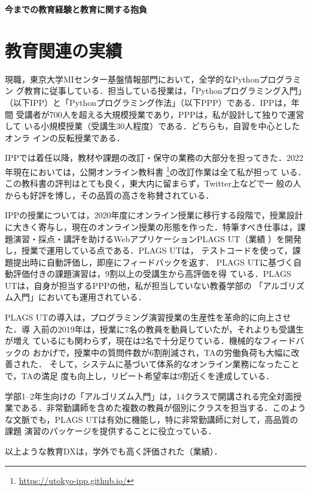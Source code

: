 \documentclass[dvipdfmx]{jsarticle}
\begin{document}
\newpage
\begin{center}
\LARGE\bfseries 今までの教育経験と教育に関する抱負
\end{center}
\bigskip

\section*{教育関連の実績}

現職，東京大学MIセンター基盤情報部門において，全学的なPythonプログラミン
グ教育に従事している．担当している授業は，「Pythonプログラミング入門」
（以下IPP）と「Pythonプログラミング作法」（以下PPP）である．IPPは，年間
受講者が700人を超える大規模授業であり，PPPは，私が設計して独りで運営して
いる小規模授業（受講生30人程度）である．どちらも，自習を中心としたオンラ
インの反転授業である．

IPPでは着任以降，教材や課題の改訂・保守の業務の大部分を担ってきた．2022
年現在においては，公開オンライン教科書
\footnote{\url{https://utokyo-ipp.github.io/}}の改訂作業は全て私が担って
いる．この教科書の評判はとても良く，東大内に留まらず，Twitter上などで一
般の人からも好評を博し，その品質の高さを称賛されている．

IPPの授業については，2020年度にオンライン授業に移行する段階で，授業設計
に大きく寄与し，現在のオンライン授業の形態を作った．特筆すべき仕事は，課
題演習・採点・講評を助けるWebアプリケーションPLAGS UT（業績
\cite{ppl22:plags}）を開発し，授業で運用している点である．PLAGS UTは，
テストコードを使って，課題提出時に自動評価し，即座にフィードバックを返す．
PLAGS UTに基づく自動評価付きの課題演習は，9割以上の受講生から高評価を得
ている．PLAGS UTは，自身が担当するPPPの他，私が担当していない教養学部の
「アルゴリズム入門」においても運用されている．

PLAGS UTの導入は，プログラミング演習授業の生産性を革命的に向上させた．導
入前の2019年は，授業に7名の教員を動員していたが，それよりも受講生が増え
ているにも関わらず，現在は2名で十分足りている．機械的なフィードバックの
おかげで，授業中の質問件数が6割削減され，TAの労働負荷も大幅に改善された．
そして，システムに基づいて体系的なオンライン業務になったことで，TAの満足
度も向上し，リピート希望率は9割近くを達成している．

学部1--2年生向けの「アルゴリズム入門」は，14クラスで開講される完全対面授
業である．非常勤講師を含めた複数の教員が個別にクラスを担当する．このよう
な文脈でも，PLAGS UTは有効に機能し，特に非常勤講師に対して，高品質の課題
演習のパッケージを提供することに役立っている．

以上ような教育DXは，学外でも高く評価された（業績\cite{axies22:plags}）．
\end{document}
